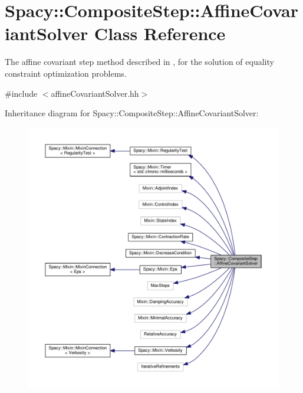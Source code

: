 \hypertarget{classSpacy_1_1CompositeStep_1_1AffineCovariantSolver}{\section{Spacy\-:\-:Composite\-Step\-:\-:Affine\-Covariant\-Solver Class Reference}
\label{classSpacy_1_1CompositeStep_1_1AffineCovariantSolver}
}


The affine covariant step method described in \cite{Lubkoll2015}, \cite{Lubkoll2015a} for the solution of equality constraint optimization problems.  




{\ttfamily \#include $<$affine\-Covariant\-Solver.\-hh$>$}



Inheritance diagram for Spacy\-:\-:Composite\-Step\-:\-:Affine\-Covariant\-Solver\-:
\nopagebreak
\begin{figure}[H]
\begin{center}
\leavevmode
\includegraphics[width=350pt]{classSpacy_1_1CompositeStep_1_1AffineCovariantSolver__inherit__graph}
\end{center}
\end{figure}



